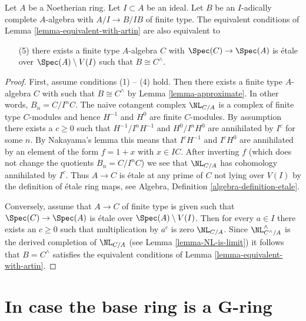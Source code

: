\begin{lemma}
\label{lemma-approximate-by-etale-over-complement}
Let $A$ be a Noetherian ring. Let $I \subset A$ be an ideal.
Let $B$ be an $I$-adically complete $A$-algebra with $A/I \to B/IB$
of finite type. The equivalent conditions of
Lemma \ref{lemma-equivalent-with-artin} are also equivalent to
\begin{enumerate}
\item[(5)]
\label{item-algebraize}
there exists a finite type $A$-algebra $C$ with
$\Spec(C) \to \Spec(A)$ is \'etale over $\Spec(A) \setminus V(I)$
such that $B \cong C^\wedge$.
\end{enumerate}
\end{lemma}

\begin{proof}
First, assume conditions (1) -- (4) hold. Then there exists
a finite type $A$-algebra $C$ with such that $B \cong C^\wedge$
by Lemma \ref{lemma-approximate}. In other words, $B_n = C/I^nC$.
The naive cotangent complex $\NL_{C/A}$ is a complex of finite type
$C$-modules and hence $H^{-1}$ and $H^0$ are finite $C$-modules.
By assumption there exists a $c \geq 0$ such that
$H^{-1}/I^nH^{-1}$ and $H^0/I^nH^0$ are annihilated by $I^c$
for some $n$. By Nakayama's lemma this means that
$I^cH^{-1}$ and $I^cH^0$ are annihilated by an element of the
form $f = 1 + x$ with $x \in IC$. After inverting $f$
(which does not change the quotients $B_n = C/I^nC$)
we see that $\NL_{C/A}$ has cohomology annihilated by $I^c$. Thus
$A \to C$ is \'etale at any prime of $C$ not lying over $V(I)$
by the definition of \'etale ring maps, see
Algebra, Definition \ref{algebra-definition-etale}.

\medskip\noindent
Conversely, assume that $A \to C$ of finite type is given such that
$\Spec(C) \to \Spec(A)$ is \'etale over $\Spec(A) \setminus V(I)$.
Then for every $a \in I$ there exists an $c \geq 0$ such that
multiplication by $a^c$ is zero $\NL_{C/A}$.
Since $\NL^\wedge_{C^\wedge/A}$ is the derived completion of
$\NL_{C/A}$ (see Lemma \ref{lemma-NL-is-limit}) it follows that
$B = C^\wedge$ satisfies the equivalent conditions of
Lemma \ref{lemma-equivalent-with-artin}.
\end{proof}








\section{In case the base ring is a G-ring}
\label{section-over-G-ring}

